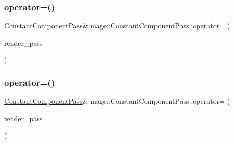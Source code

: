 \subsubsection{\texorpdfstring{operator=()}{operator=()}\hspace{0.1cm}{\footnotesize\ttfamily [1/2]}}
{\footnotesize\ttfamily \hyperlink{classmage_1_1_constant_component_pass}{Constant\+Component\+Pass}\& mage\+::\+Constant\+Component\+Pass\+::operator= (\begin{DoxyParamCaption}\item[{const \hyperlink{classmage_1_1_constant_component_pass}{Constant\+Component\+Pass} \&}]{render\+\_\+pass }\end{DoxyParamCaption})\hspace{0.3cm}{\ttfamily [delete]}}

\hypertarget{classmage_1_1_constant_component_pass_ab1944cfe6c59d28d34fb6c6d05bd0b96}{}\label{classmage_1_1_constant_component_pass_ab1944cfe6c59d28d34fb6c6d05bd0b96} 
\subsubsection{\texorpdfstring{operator=()}{operator=()}\hspace{0.1cm}{\footnotesize\ttfamily [2/2]}}
{\footnotesize\ttfamily \hyperlink{classmage_1_1_constant_component_pass}{Constant\+Component\+Pass}\& mage\+::\+Constant\+Component\+Pass\+::operator= (\begin{DoxyParamCaption}\item[{\hyperlink{classmage_1_1_constant_component_pass}{Constant\+Component\+Pass} \&\&}]{render\+\_\+pass }\end{DoxyParamCaption})\hspace{0.3cm}{\ttfamily [delete]}}

\hypertarget{classmage_1_1_constant_component_pass_a1f890345d560ee2652fa4772dfe50d7a}{}\label{classmage_1_1_constant_component_pass_a1f890345d560ee2652fa4772dfe50d7a} 
